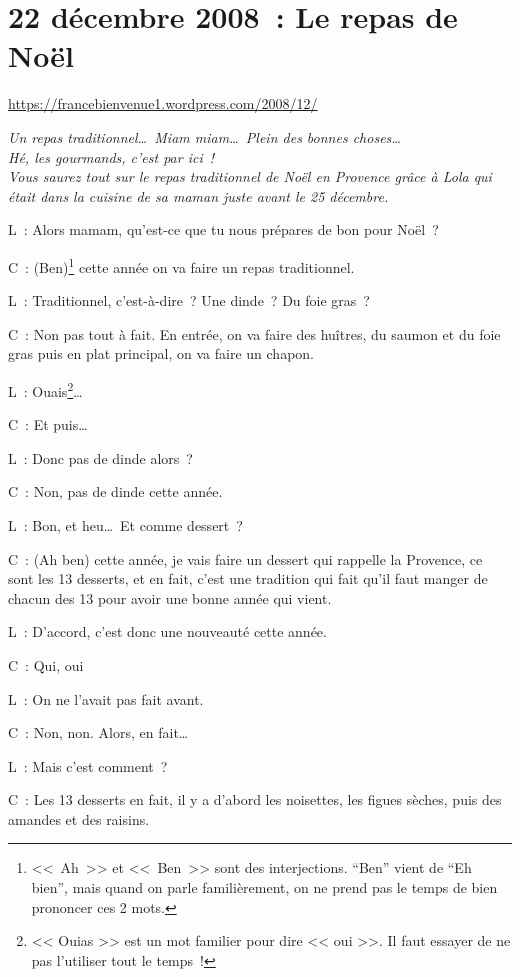 \documentclass[11pt, french]{report}
\begin{document}
\chapter{22 décembre 2008~: Le repas de Noël}

\url{https://francebienvenue1.wordpress.com/2008/12/}

\vfill

\textit{Un repas traditionnel\ldots\ Miam miam\ldots\ Plein des bonnes
choses\ldots\ \\
Hé, les gourmands, c'est par ici~!\\
Vous saurez tout sur le repas traditionnel de Noël en Provence grâce à Lola
qui était dans la cuisine de sa maman juste avant le 25 décembre.} 

\vfill

L~: Alors mamam, qu'est-ce que tu nous prépares de bon pour Noël~?

C~: (Ben)\footnote{<<~Ah~>> et <<~Ben~>> sont des interjections.  ``Ben'' vient
  de ``Eh bien'', mais quand on parle familièrement, on ne prend pas le temps
  de bien prononcer ces 2 mots.} cette année on va faire un repas traditionnel.

L~: Traditionnel, c'est-à-dire~? Une dinde~? Du foie gras~?

C~: Non pas tout à fait.  En entrée, on va faire des huîtres, du saumon et
du foie gras puis en plat principal, on va faire un chapon.

L~: Ouais\footnote{<< Ouias >> est un mot familier pour dire << oui >>.  Il faut
  essayer de ne pas l'utiliser tout le temps~!}\ldots

C~: Et puis\ldots

L~: Donc pas de dinde alors~?

C~: Non, pas de dinde cette année.

L~: Bon, et heu\ldots\ Et comme dessert~?

C~: (Ah ben) cette année, je vais faire un dessert qui rappelle la Provence, ce
sont les 13 desserts, et en fait, c'est une tradition qui fait qu'il faut manger
de chacun des 13 pour avoir une bonne année qui vient.

L~: D'accord, c'est donc une nouveauté cette année.

C~: Qui, oui

L~: On ne l’avait pas fait avant.

C~: Non, non. Alors, en fait\ldots

L~: Mais c’est comment~?

C~: Les 13 desserts en fait, il y a d’abord les noisettes, les figues sèches,
puis des amandes et des raisins.
\end{document}
